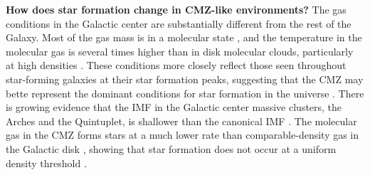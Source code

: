 \documentclass{aastex62}
\begin{document}
\textbf{How does star formation change in CMZ-like environments?}
The gas conditions in the Galactic center are substantially different from the rest of the Galaxy.
Most of the gas mass is in a molecular state \citep[need to cite others][]{Mills2017a}, and the temperature in the molecular gas is several times
higher than in disk molecular clouds, particularly at high densities \citep{Ao2013a,Ginsburg2016a,Krieger2017a}.
These conditions more closely reflect those seen throughout star-forming galaxies at their star formation
peaks, suggesting that the CMZ may bette represent the dominant conditions for star formation in the universe
\citep{Kruijssen2013a}.
There is growing evidence that the IMF in the Galactic center massive clusters, the Arches and the Quintuplet,
is shallower than the canonical IMF \citep{Hosek2018a}.  The molecular gas in the CMZ forms stars at a much
lower rate than comparable-density gas in the Galactic disk \citep{Longmore2013b}, showing that star formation
does not occur at a uniform density threshold \citep{Walker2017a,Barnes2017b,Ginsburg2018a}.


\end{document}
